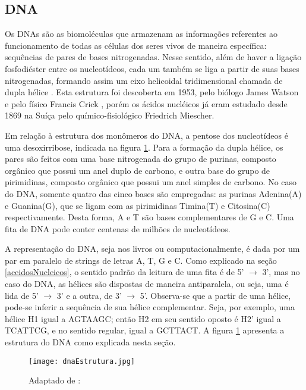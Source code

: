 \subsection{DNA} \label{aceidosNucleicos:dna}

\indent Os DNAs são as biomoléculas que armazenam as informações referentes ao funcionamento de todas as células dos seres vivos de maneira específica: sequências de pares de bases nitrogenadas. Nesse sentido, além de haver a ligação fosfodiéster entre os nucleotídeos, cada um também se liga a partir de suas bases nitrogenadas, formando assim um eixo helicoidal tridimensional chamada de dupla hélice \cite{setubal97}. Esta estrutura foi descoberta em 1953, pelo biólogo James Watson e pelo físico Francis Crick \cite{dnadiscovery08}, porém os ácidos nucléicos já eram estudado desde 1869 na Suíça pelo químico-fisiológico Friedrich Miescher.

\indent Em relação à estrutura dos monômeros do DNA, a pentose dos nucleotídeos é uma desoxirribose, indicada na figura \ref{fig:EstruturasDoDNA}. Para a formação da dupla hélice, os pares são feitos com uma base nitrogenada do grupo de purinas, composto orgânico que possui um anel duplo de carbono, e outra base do grupo de pirimidinas, composto orgânico que possui um anel simples de carbono. No caso do DNA, somente quatro das cinco bases são empregadas: as purinas Adenina(A) e Guanina(G), que se ligam com as pirimidinas Timina(T) e Citosina(C) respectivamente. Desta forma, A e T são bases complementares de G e C. Uma fita de DNA pode conter centenas de milhões de nucleotídeos.

\indent A representação do DNA, seja nos livros ou computacionalmente, é dada por um par em paralelo de strings de letras A, T, G e C. Como explicado na seção \ref{aceidosNucleicos}, o sentido padrão da leitura de uma fita é de 5' $\rightarrow$ 3', mas no caso do DNA, as hélices são dispostas de maneira antiparalela, ou seja, uma é lida de 5' $\rightarrow$ 3' e a outra, de 3' $\rightarrow$ 5'. Observa-se que a partir de uma hélice, pode-se inferir a sequência de sua hélice complementar. Seja, por exemplo, uma hélice H1 igual a AGTAAGC; então H2 em seu sentido oposto é H2' igual a TCATTCG, e no sentido regular, igual a GCTTACT. A figura \ref{fig:EstruturasDoDNA} apresenta a estrutura do DNA como explicada nesta seção.

\begin{figure}[h]
    \centering
    \texttt{[image: dnaEstrutura.jpg]}
    \caption{Adaptado de : \cite{dnadiscovery08} }
    \label{fig:EstruturasDoDNA}
\end{figure} 


